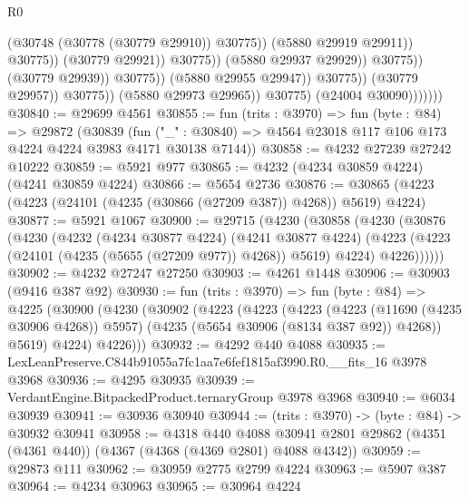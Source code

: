 \begin{lexlean}{R0}
\begin{coremodule}
                                                          (@30748 (@30778 (@30779 @29910)) @30775))
                                                        (@5880 @29919 @29911))
                                                      @30775))
                                                  (@30779 @29921))
                                                @30775))
                                            (@5880 @29937 @29929))
                                          @30775))
                                      (@30779 @29939))
                                    @30775))
                                (@5880 @29955 @29947))
                              @30775))
                          (@30779 @29957))
                        @30775))
                    (@5880 @29973 @29965))
                  @30775)
                (@24004 @30090)))))))
@30840 := @29699 @4561
@30855 := fun (trits : @3970) =>
  fun (byte : @84) =>
  @29872
    (@30839
      (fun ("_" : @30840) => @4564 @23018 @117 @106 @173 @4224 @4224 @3983 @4171 @30138 @7144))
@30858 := @4232 @27239 @27242 @10222
@30859 := @5921 @977
@30865 := @4232 (@4234 @30859 @4224) (@4241 @30859 @4224)
@30866 := @5654 @2736
@30876 := @30865 (@4223 (@4223 (@24101 (@4235 (@30866 (@27209 @387)) @4268)) @5619) @4224)
@30877 := @5921 @1067
@30900 := @29715
    (@4230
      (@30858
        (@4230
          (@30876
            (@4230
              (@4232
                (@4234 @30877 @4224)
                (@4241 @30877 @4224)
                (@4223 (@4223 (@24101 (@4235 (@5655 (@27209 @977)) @4268)) @5619) @4224)
                @4226))))))
@30902 := @4232 @27247 @27250
@30903 := @4261 @1448
@30906 := @30903 (@9416 @387 @92)
@30930 := fun (trits : @3970) =>
  fun (byte : @84) =>
  @4225
    (@30900
      (@4230
        (@30902
          (@4223
            (@4223
              (@4223
                (@4223 (@11690 (@4235 @30906 @4268)) @5957)
                (@4235 (@5654 @30906 (@8134 @387 @92)) @4268))
              @5619)
            @4224)
          @4226)))
@30932 := @4292 @440 @4088
@30935 := LexLeanPreserve.C844b91055a7fc1aa7e6fef1815af3990.R0.__fits_16 @3978 @3968
@30936 := @4295 @30935
@30939 := VerdantEngine.BitpackedProduct.ternaryGroup @3978 @3968
@30940 := @6034 @30939
@30941 := @30936 @30940
@30944 := (trits : @3970) -> (byte : @84) -> @30932 @30941
@30958 := @4318
    @440
    @4088
    @30941
    @2801
    @29862
    (@4351 (@4361 @440))
    (@4367 (@4368 (@4369 @2801) @4088 @4342))
@30959 := @29873 @111
@30962 := @30959 @2775 @2799 @4224
@30963 := @5907 @387
@30964 := @4234 @30963
@30965 := @30964 @4224

\end{coremodule}
\end{lexlean}
